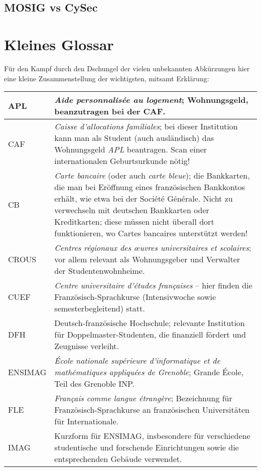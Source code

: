 \documentclass[11pt,a4paper]{article}
\begin{document}
  \subsection{MOSIG vs CySec}

	
	\newpage
	\section{Kleines Glossar}
	
	Für den Kampf durch den Dschungel der vielen unbekannten Abkürzungen hier eine kleine Zusammenstellung der wichtigsten, mitsamt Erklärung:\\
	
	\noindent \begin{tabularx}{\columnwidth}{|l|X|}
		\hline
		APL & \emph{Aide personnalisée au logement}; Wohnungsgeld, beanzutragen bei der CAF. \\ \hline
		CAF & \emph{Caisse d’allocations familiales}; bei dieser Institution kann man als Student (auch ausländisch) das Wohnungsgeld \emph{APL} beantragen. Scan einer internationalen Geburtsurkunde nötig! \\ \hline
		CB & \emph{Carte bancaire} (oder auch \emph{carte bleue}); die Bankkarten, die man bei Eröffnung eines französischen Bankkontos erhält, wie etwa bei der Société Générale. Nicht zu verwechseln mit deutschen Bankkarten oder Kreditkarten; diese müssen nicht überall dort funktionieren, wo Cartes bancaires unterstützt werden! \\ \hline
		CROUS & \emph{Centres régionaux des œuvres universitaires et scolaires}; vor allem relevant als Wohnungsgeber und Verwalter der Studentenwohnheime. \\ \hline
		CUEF & \emph{Centre universitaire d'études françaises} -- hier finden die Französisch-Sprachkurse (Intensivwoche sowie semesterbegleitend) statt. \\ \hline
		DFH & Deutsch-französische Hochschule; relevante Institution für Doppelmaster-Studenten, die finanziell fördert und Zeugnisse verleiht. \\ \hline
		ENSIMAG & \emph{École nationale supérieure d'informatique et de mathématiques appliquées de Grenoble}; Grande École, Teil des Grenoble INP. \\ \hline
		FLE & \emph{Français comme langue étrangère}; Bezeichnung für Französisch-Sprachkurse an französischen Universitäten für Internationale. \\ \hline
		IMAG & Kurzform für ENSIMAG, insbesondere für verschiedene studentische und forschende Einrichtungen sowie die entsprechenden Gebäude verwendet. \\ \hline

\end{tabularx}
\end{document}
